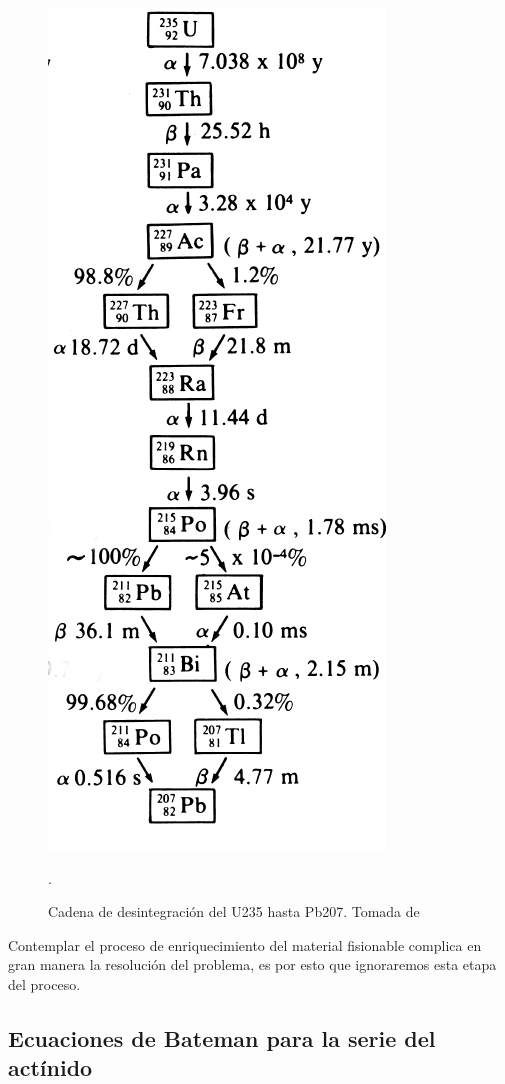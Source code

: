 \begin{figure}[H]
    \centering
    \includegraphics[scale=0.425]{imagenes/cadenaluz.png}
    \caption{Cadena de desintegración del U235 hasta Pb207. Tomada de \cite{HUBENER2003211}}.
    \label{cadenadelu235}
\end{figure}

Contemplar el proceso de enriquecimiento del material fisionable complica en gran manera la resolución del problema, es por esto que ignoraremos esta etapa del proceso.  

\subsection{Ecuaciones de Bateman para la serie del actínido}


